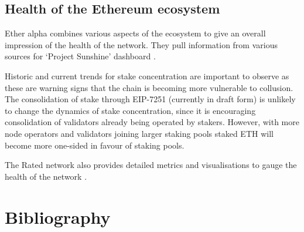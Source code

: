 \documentclass[UTF8]{article}
\begin{document}
\subsection{Health of the Ethereum ecosystem}
Ether alpha combines various aspects of the ecosystem to give an overall impression of the health of the network. They pull information from various sources for `Project Sunshine' dashboard \cite{easunshine}. 

Historic and current trends for stake concentration are important to observe as these are warning signs that the chain is becoming more vulnerable to collusion. The consolidation of stake through EIP-7251 (currently in draft form) \cite{Neuder2023c} is unlikely to change the dynamics of stake concentration, since it is encouraging consolidation of validators already being operated by stakers. However, with more node operators and validators joining larger staking pools staked ETH will become more one-sided in favour of staking pools. 

The Rated network also provides detailed metrics and visualisations to gauge the health of the network \cite{Rated2023a}. 


\section{Bibliography}
\nocite{*}


\end{document}
